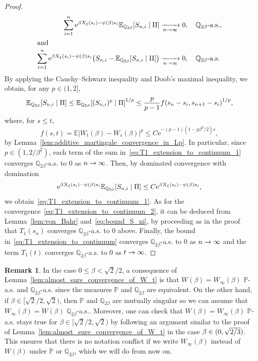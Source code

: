 \documentclass[10pt]{amsart}
\theoremstyle{definition}\newtheorem{defi}[theo]{Definition}\newtheorem{rema}[theo]{Remark}\newtheorem{exam}[theo]{Example}\newtheorem{exem}[theo]{Example}\newtheorem{nota}[theo]{Notation}
\newcommand{\e}{\mathrm{e}}
\newcommand{\E}{\mathbb{E}}
\renewcommand{\P}{\mathbb{P}}
\newcommand{\Q}{\mathbb{Q}}
\newcommand\1{\mathds{1}}
\let\originalleft\left
\let\originalright\right
\renewcommand{\left}{\mathopen{}\mathclose\bgroup\originalleft}
\renewcommand{\right}{\aftergroup\egroup\originalright}
\renewcommand*{\to}{\mathchoice{\longrightarrow}{\rightarrow}{\rightarrow}{\rightarrow}}
\begin{document}
\begin{proof}
\begin{align}
\sum_{i = 1}^n \e^{\beta X_\xi(s_i) - \psi(\beta)s_i} \E_{\Q_{2\beta}} \left[S_{n, i} \mid \Pi \right] &\xrightarrow[n \to \infty]{} 0, \quad \Q_{2\beta}\text{-a.s.},\label{eq:T1_extension_to_continuum_1}
\\
\intertext{and}
\sum_{i = 1}^n \e^{\beta X_\xi(s_i) - \psi(\beta)s_i} \left(S_{n, i} - \E_{\Q_{2\beta}} \left[S_{n, i} \mid \Pi \right] \right) &\xrightarrow[n \to \infty]{} 0, \quad \Q_{2\beta}\text{-a.s.}\label{eq:T1_extension_to_continuum_2}
\end{align}
By applying the Cauchy--Schwarz inequality and Doob's maximal inequality, we obtain, for any $p \in (1,2]$,
\begin{equation}\label{eq:bound_S_ni}
\E_{\Q_{2\beta}} \left[S_{n, i} \mid \Pi \right]
\leq \E_{\Q_{2\beta}} \left[(S_{n, i})^p \mid \Pi \right]^{1/p}
\leq \frac{p}{p-1} f\left(s_n - s_i, s_{n+1} - s_i\right)^{1/p},
\end{equation}
where, for $s \leq t$,
\begin{equation*}
f(s, t) = \E|W_t(\beta) - W_s(\beta)|^p \leq C \e^{-(p - 1)(1 - p\beta^2/2)s},
\end{equation*}
by Lemma~\ref{lem:additive_martingale_convergence_in_Lp}. In particular, since $p \in (1, 2/\beta^2)$, each term of the sum in~\eqref{eq:T1_extension_to_continuum_1} converges $\Q_{2\beta}$-a.s. to $0$ as $n \to \infty$. Then, by dominated convergence with domination
\begin{equation*}
\e^{\beta X_\xi(s_i) - \psi(\beta)s_i} \E_{\Q_{2\beta}} \left[S_{n, i} \mid \Pi \right] \leq C \e^{\beta X_\xi(s_i) - \psi(\beta)s_i},
\end{equation*}
we obtain~\eqref{eq:T1_extension_to_continuum_1}. As for the convergence~\eqref{eq:T1_extension_to_continuum_2}, it can be deduced from Lemma~\ref{lem:von_Bahr} and~\eqref{eq:bound_S_ni}, by proceeding as in the proof that $T_1(s_n)$ converges $\Q_{2\beta}$-a.s. to $0$ above. Finally, the bound in~\eqref{eq:T1_extension_to_continuum} converges $\Q_{2\beta}$-a.s. to $0$ as $n \to \infty$ and the term $T_1(t)$ converges $\Q_{2\beta}$-a.s. to $0$ as $t \to \infty$.
\end{proof}

\begin{rema}\label{rem:W(beta)_vs_Winfty(beta)}
In the case $0 \leq \beta < \sqrt{2}/2$, a consequence of Lemma~\ref{lem:almost_sure_convergence_of_W_t} is that $W(\beta) = W_\infty(\beta)$ $\P$-a.s. and $\Q_{2\beta}$-a.s. since the measures $\P$ and $\Q_{2\beta}$ are equivalent. On the other hand, if $\beta \in [\sqrt{2}/2,\sqrt{2})$, then $\P$ and $\Q_{2\beta}$ are mutually singular so we can assume that $W_\infty(\beta) = W(\beta)$ $\Q_{2\beta}$-a.s.. Moreover, one can check that $W(\beta) = W_\infty(\beta)$ $\P$-a.s. stays true for $\beta \in [\sqrt{2}/2,\sqrt{2})$ by following an argument similar to the proof of Lemma~\ref{lem:almost_sure_convergence_of_W_t} in the case $\beta \in (0,\sqrt{2\smash{/}3})$. This ensures that there is no notation conflict if we write $W_\infty(\beta)$ instead of $W(\beta)$ under $\P$ or $\Q_{2\beta}$, which we will do from now on.
\end{rema}
\end{document}
